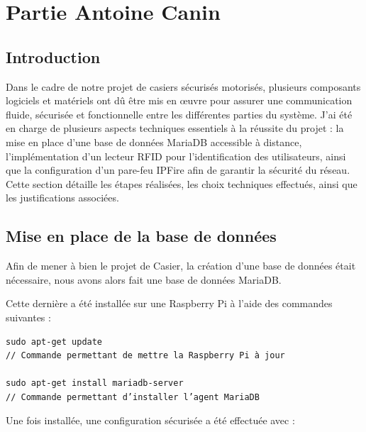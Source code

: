 \documentclass[main.tex]{subfiles}
\begin{document}


\section{Partie Antoine Canin}

\subsection{Introduction}

\quad Dans le cadre de notre projet de casiers sécurisés motorisés, plusieurs composants logiciels
et matériels ont dû être mis en œuvre pour assurer une communication fluide, sécurisée et
fonctionnelle entre les différentes parties du système. J’ai été en charge de plusieurs
aspects techniques essentiels à la réussite du projet : la mise en place d’une base de
données MariaDB accessible à distance, l’implémentation d’un lecteur RFID pour l’identification des utilisateurs, ainsi que la configuration d’un pare-feu IPFire afin de garantir
la sécurité du réseau. Cette section détaille les étapes réalisées, les choix techniques
effectués, ainsi que les justifications associées.

\subsection{Mise en place de la base de données}

\quad Afin de mener à bien le projet de Casier, la création d’une base de données était nécessaire, nous avons alors fait une base de données MariaDB.

Cette dernière a été installée sur une Raspberry Pi à l’aide des commandes suivantes :

\begin{lstlisting}
sudo apt-get update
// Commande permettant de mettre la Raspberry Pi à jour

sudo apt-get install mariadb-server
// Commande permettant d’installer l’agent MariaDB
\end{lstlisting}

Une fois installée, une configuration sécurisée a été effectuée avec :
\end{document}
